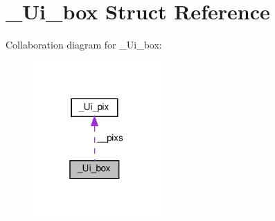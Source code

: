\hypertarget{struct__Ui__box}{}\section{\+\_\+\+Ui\+\_\+box Struct Reference}
\label{struct__Ui__box}


Collaboration diagram for \+\_\+\+Ui\+\_\+box\+:\nopagebreak
\begin{figure}[H]
\begin{center}
\leavevmode
\includegraphics[width=139pt]{struct__Ui__box__coll__graph}
\end{center}
\end{figure}
